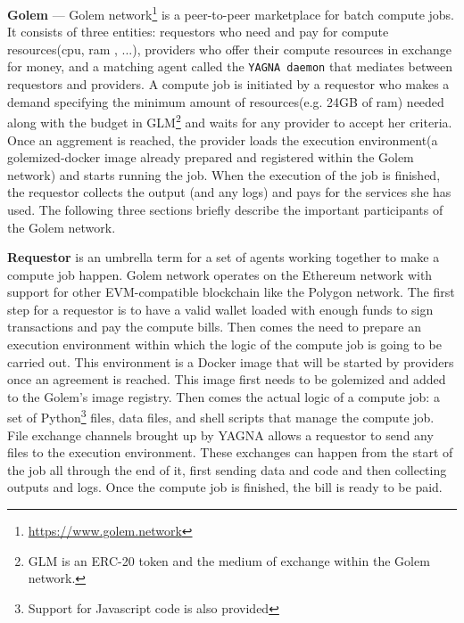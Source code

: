\documentclass[a4paper, 10pt]{article}
\begin{document}
\par
\textbf{Golem} --- Golem network\footnote{\url{https://www.golem.network}} is a peer-to-peer marketplace for batch compute jobs. It consists of three entities: requestors who need and pay for compute resources(cpu, ram , ...), providers who offer their compute resources in exchange for money, and a matching agent called the \texttt{YAGNA daemon} that mediates between requestors and providers. A compute job is initiated by a requestor who makes a demand specifying the minimum amount of resources(e.g. 24GB of ram) needed along with the budget in GLM\footnote{GLM is an ERC-20 token and the medium of exchange within the Golem network.} and waits for any provider to accept her criteria. Once an aggrement is reached, the provider loads the execution environment(a golemized-docker image already prepared and registered within the Golem network) and starts running the job. When the execution of the job is finished, the requestor collects the output (and any logs) and pays for the services she has used. The following three sections briefly describe the important participants of the Golem network.
\par
\textbf{Requestor} is an umbrella term for a set of agents working together to make a compute job happen. Golem network operates on the Ethereum network with support for other EVM-compatible blockchain like the Polygon network. The first step for a requestor is to have a valid wallet loaded with enough funds to sign transactions and pay the compute bills. Then comes the need to prepare an execution environment within which the logic of the compute job is going to be carried out. This environment is a Docker image that will be started by providers once an agreement is reached. This image first needs to be golemized and added to the Golem's image registry. Then comes the actual logic of a compute job: a set of Python\footnote{Support for Javascript code is also provided} files, data files, and shell scripts that manage the compute job. File exchange channels brought up by YAGNA allows a requestor to send any files to the execution environment. These exchanges can happen from the start of the job all through the end of it, first sending data and code and then collecting outputs and logs. Once the compute job is finished, the bill is ready to be paid.
\par
\end{document}
